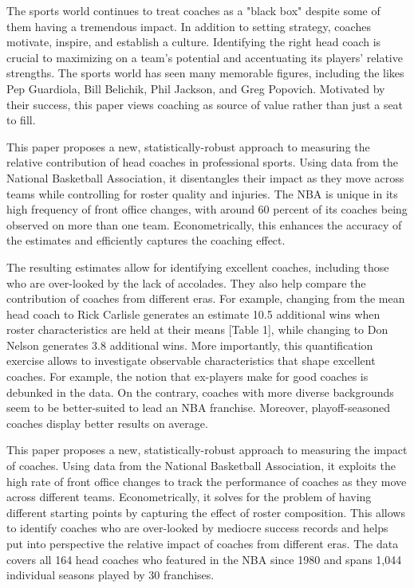 \documentclass[main.tex]{subfiles}
\begin{document}
The sports world continues to treat coaches as a "black box" despite some of them having a tremendous impact. In addition to setting strategy, coaches motivate, inspire, and establish a culture. Identifying the right head coach is crucial to maximizing on a team's potential and accentuating its players' relative strengths. The sports world has seen many memorable figures, including the likes Pep Guardiola, Bill Belichik, Phil Jackson, and Greg Popovich. Motivated by their success, this paper views coaching as source of value rather than just a seat to fill. 

This paper proposes a new, statistically-robust approach to measuring the relative contribution of head coaches in professional sports. Using data from the National Basketball Association, it disentangles their impact as they move across teams while controlling for roster quality and injuries. The NBA is unique in its high frequency of front office changes, with around 60 percent of its coaches being observed on more than one team. Econometrically, this enhances the accuracy of the estimates and efficiently captures the coaching effect.

The resulting estimates allow for identifying excellent coaches, including those who are over-looked by the lack of accolades. They also help compare the contribution of coaches from different eras. For example, changing from the mean head coach to Rick Carlisle generates an estimate 10.5 additional wins when roster characteristics are held at their means [Table 1], while changing to Don Nelson generates 3.8 additional wins. More importantly, this quantification exercise allows to investigate observable characteristics that shape excellent coaches. For example, the notion that ex-players make for good coaches is debunked in the data. On the contrary, coaches with more diverse backgrounds seem to be better-suited to lead an NBA franchise. Moreover, playoff-seasoned coaches display better results on average.



This paper proposes a new, statistically-robust approach to measuring the impact of coaches. Using data from the National Basketball Association, it exploits the high rate of front office changes to track the performance of coaches as they move across different teams. Econometrically, it solves for the problem of having different starting points by capturing the effect of roster composition. This allows to identify coaches who are over-looked by mediocre success records and helps put into perspective the relative impact of coaches from different eras. The data covers all 164 head coaches who featured in the NBA since 1980 and spans 1,044 individual seasons played by 30 franchises. 
\end{document}
